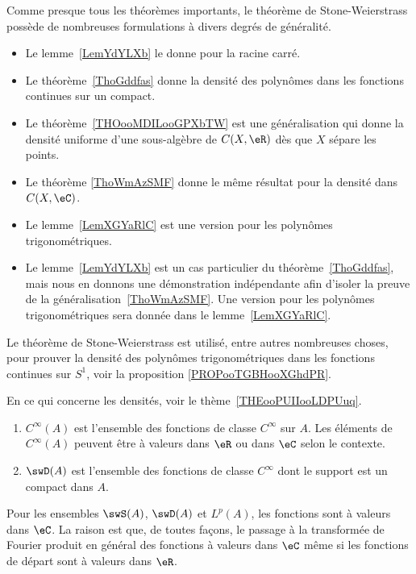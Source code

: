 Comme presque tous les théorèmes importants, le théorème de Stone-Weierstrass possède de nombreuses formulations à divers degrés de généralité.
\begin{itemize}
    \item Le lemme~\ref{LemYdYLXb} le donne pour la racine carré.
    \item Le théorème~\ref{ThoGddfas} donne la densité des polynômes dans les fonctions continues sur un compact.
    \item Le théorème~\ref{THOooMDILooGPXbTW} est une généralisation qui donne la densité uniforme d'une sous-algèbre de \( C(X,\eR)\) dès que \( X\) sépare les points.
    \item Le théorème \ref{ThoWmAzSMF} donne le même résultat pour la densité dans \( C(X,\eC)\).
    \item Le lemme~\ref{LemXGYaRlC} est une version pour les polynômes trigonométriques.
    \item
        Le lemme~\ref{LemYdYLXb} est un cas particulier du
        théorème~\ref{ThoGddfas}, mais nous en donnons une démonstration indépendante afin d'isoler la preuve
de la généralisation~\ref{ThoWmAzSMF}.
Une version pour les polynômes trigonométriques sera donnée dans le lemme~\ref{LemXGYaRlC}.
\end{itemize}
Le théorème de Stone-Weierstrass est utilisé, entre autres nombreuses choses, pour prouver la densité des polynômes trigonométriques dans les fonctions continues sur \( S^1\), voir la proposition \ref{PROPooTGBHooXGhdPR}.


                \label{THEMooNMYKooVVeGTU}

En ce qui concerne les densités, voir le thème~\ref{THEooPUIIooLDPUuq}.
\begin{enumerate}
    \item
        \(  C^{\infty}(A)\) est l'ensemble des fonctions de classe \(  C^{\infty}\) sur \( A\). Les éléments de \(  C^{\infty}(A)\) peuvent être à valeurs dans \( \eR\) ou dans \( \eC\) selon le contexte.
    \item
        \( \swD(A)\) est l'ensemble des fonctions de classe \(  C^{\infty}\) dont le support est un compact dans \( A\).
\end{enumerate}
Pour les ensembles \( \swS(A)\), \( \swD(A)\) et \( L^p(A)\), les fonctions sont à valeurs dans \( \eC\). La raison est que, de toutes façons, le passage à la transformée de Fourier produit en général des fonctions à valeurs dans \( \eC\) même si les fonctions de départ sont à valeurs dans \( \eR\).

